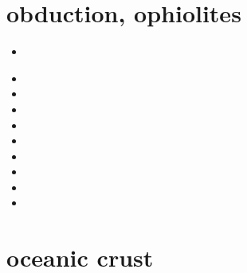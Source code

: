 \section{obduction, ophiolites}

\begin{small}
\begin{itemize}
\item[\nineteenninety] 
\\ 
\item[\nineteenninetyone] 
\item[\nineteenninetyseven] 
\item[\twothousand] 
\item[\twothousandfourteen] 
\item[\twothousandsixteen] 
\item[\twothousandtwenty] 
\item[\twothousandtwentyone] 
\item[\twothousandtwentytwo] 
\item[\twothousandtwentyfive] 
\end{itemize}
\end{small}




\section{oceanic crust} 

